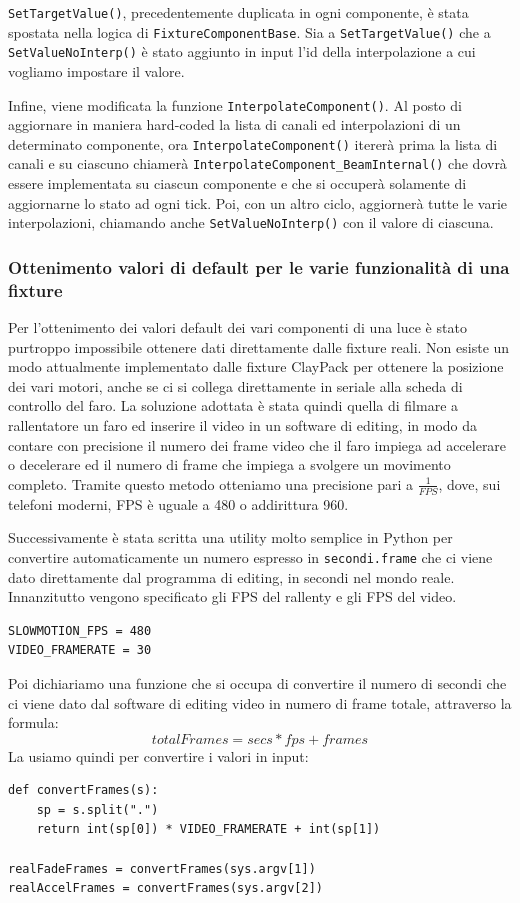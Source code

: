 \documentclass[main.tex]{subfiles}
\begin{document}
\lstinline{SetTargetValue()}, precedentemente duplicata in ogni componente, è stata spostata nella logica di \lstinline{FixtureComponentBase}. Sia a \lstinline{SetTargetValue()} che a \lstinline{SetValueNoInterp()} è stato aggiunto in input l'id della interpolazione a cui vogliamo impostare il valore. 

Infine, viene modificata la funzione \lstinline{InterpolateComponent()}. Al posto di aggiornare in maniera hard-coded la lista di canali ed interpolazioni di un determinato componente, ora \lstinline{InterpolateComponent()} itererà prima la lista di canali e su ciascuno chiamerà \lstinline{InterpolateComponent_BeamInternal()} che dovrà essere implementata su ciascun componente e che si occuperà solamente di aggiornarne lo stato ad ogni tick. Poi, con un altro ciclo, aggiornerà tutte le varie interpolazioni, chiamando anche \lstinline{SetValueNoInterp()} con il valore di ciascuna.

\subsubsection{Ottenimento valori di default per le varie funzionalità di una fixture}\label{subsec:3_1_defaultValues}
Per l'ottenimento dei valori default dei vari componenti di una luce è stato purtroppo impossibile ottenere dati direttamente dalle fixture reali. Non esiste un modo attualmente implementato dalle fixture ClayPack per ottenere la posizione dei vari motori, anche se ci si collega direttamente in seriale alla scheda di controllo del faro. La soluzione adottata è stata quindi quella di filmare a rallentatore un faro ed inserire il video in un software di editing, in modo da contare con precisione il numero dei frame video che il faro impiega ad accelerare o decelerare ed il numero di frame che impiega a svolgere un movimento completo. Tramite questo metodo otteniamo una precisione pari a $\frac{1}{FPS}$, dove, sui telefoni moderni, FPS è uguale a 480 o addirittura 960.\newline

Successivamente è stata scritta una utility molto semplice in Python per convertire automaticamente un numero espresso in \lstinline{secondi.frame} che ci viene dato direttamente dal programma di editing, in secondi nel mondo reale. \newline
Innanzitutto vengono specificato gli FPS del rallenty e gli FPS del video.
\lstset{language=python}
\begin{lstlisting}
SLOWMOTION_FPS = 480
VIDEO_FRAMERATE = 30
\end{lstlisting}
Poi dichiariamo una funzione che si occupa di convertire il numero di secondi che ci viene dato dal software di editing video in numero di frame totale, attraverso la formula:
\[totalFrames = secs * fps + frames\]
La usiamo quindi per convertire i valori in input:
\begin{lstlisting}
def convertFrames(s):
    sp = s.split(".")
    return int(sp[0]) * VIDEO_FRAMERATE + int(sp[1])

realFadeFrames = convertFrames(sys.argv[1])
realAccelFrames = convertFrames(sys.argv[2])
\end{lstlisting}
\end{document}
